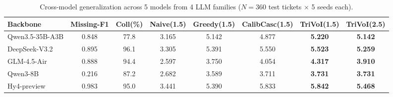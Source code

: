 \begin{table}[t]
\centering
\caption{Cross-model generalization across 5 models from 4 LLM families ($N=360$ test tickets $\times$ 5 seeds each).}
\begin{tabular}{lccccccc}
\hline
Backbone & Missing-F1 & Coll(\%) & Naive(1.5) & Greedy(1.5) & CalibCasc(1.5) & TriVoI(1.5) & TriVoI(2.5) \\
\hline
Qwen3.5-35B-A3B & 0.848 & 77.8 & 3.165 & 5.142 & 4.877 & \textbf{5.220} & \textbf{5.142} \\
DeepSeek-V3.2 & 0.895 & 96.1 & 3.305 & 5.391 & 5.550 & \textbf{5.523} & \textbf{5.259} \\
GLM-4.5-Air & 0.888 & 94.4 & 2.597 & 3.750 & 4.054 & \textbf{4.317} & \textbf{3.910} \\
Qwen3-8B & 0.216 & 87.2 & 2.682 & 3.589 & 3.711 & \textbf{3.731} & \textbf{3.731} \\
Hy4-preview & 0.983 & 95.0 & 3.441 & 5.390 & 5.833 & \textbf{5.842} & \textbf{5.468} \\
\hline
\end{tabular}
\end{table}
